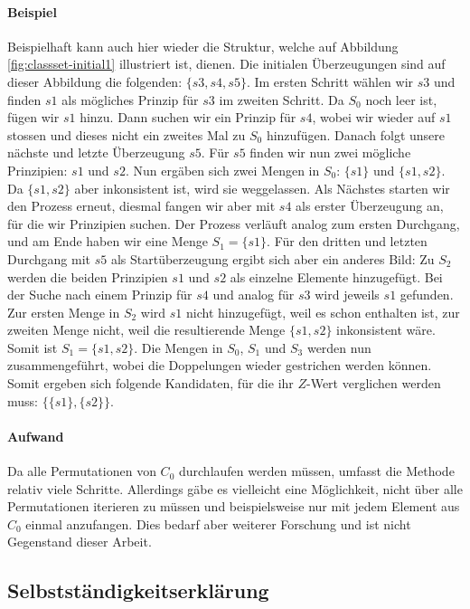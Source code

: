 \documentclass{article}
\begin{document}
\paragraph{Beispiel}
Beispielhaft kann auch hier wieder die Struktur, welche auf Abbildung \ref{fig:classset-initial1} illustriert ist, dienen. Die initialen Überzeugungen sind auf dieser Abbildung die folgenden: $\{s3, s4, s5\}$. Im ersten Schritt wählen wir $s3$ und finden $s1$ als mögliches Prinzip für $s3$ im zweiten Schritt. Da $S_0$ noch leer ist, fügen wir $s1$ hinzu. Dann suchen wir ein Prinzip für $s4$, wobei wir wieder auf $s1$ stossen und dieses nicht ein zweites Mal zu $S_0$ hinzufügen. Danach folgt unsere nächste und letzte Überzeugung $s5$. Für $s5$ finden wir nun zwei mögliche Prinzipien: $s1$ und $s2$. Nun ergäben sich zwei Mengen in $S_0$: $\{s1\}$ und $\{s1, s2\}$. Da $\{s1, s2\}$ aber inkonsistent ist, wird sie weggelassen. Als Nächstes starten wir den Prozess erneut, diesmal fangen wir aber mit $s4$ als erster Überzeugung an, für die wir Prinzipien suchen. Der Prozess verläuft analog zum ersten Durchgang, und am Ende haben wir eine Menge $S_1 = \{s1\}$. Für den dritten und letzten Durchgang mit $s5$ als Startüberzeugung ergibt sich aber ein anderes Bild: Zu $S_2$ werden die beiden Prinzipien $s1$ und $s2$ als einzelne Elemente hinzugefügt. Bei der Suche nach einem Prinzip für $s4$ und analog für $s3$ wird jeweils $s1$ gefunden. Zur ersten Menge in $S_2$ wird $s1$ nicht hinzugefügt, weil es schon enthalten ist, zur zweiten Menge nicht, weil die resultierende Menge $\{s1,s2\}$ inkonsistent wäre. Somit ist $S_1 = \{{s1}, {s2}\}$. Die Mengen in $S_0$, $S_1$ und $S_3$ werden nun zusammengeführt, wobei die Doppelungen wieder gestrichen werden können. Somit ergeben sich folgende Kandidaten, für die ihr $Z$-Wert verglichen werden muss: $\{\{s1\}, \{s2\}\}$.

\paragraph{Aufwand}
Da alle Permutationen von $C_0$ durchlaufen werden müssen, umfasst die Methode relativ viele Schritte. Allerdings gäbe es vielleicht eine Möglichkeit, nicht über alle Permutationen iterieren zu müssen und beispielsweise nur mit jedem Element aus $C_0$ einmal anzufangen. Dies bedarf aber weiterer Forschung und ist nicht Gegenstand dieser Arbeit.

\newpage
\subsection{Selbstständigkeitserklärung}
\end{document}
